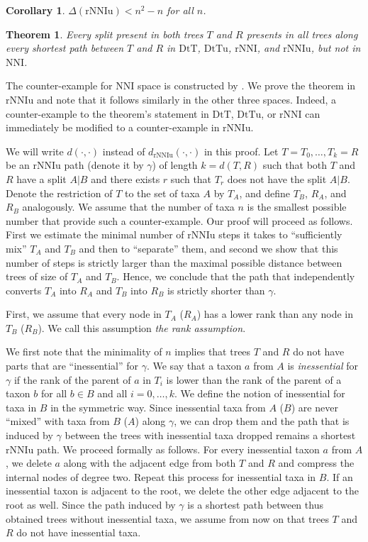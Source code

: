 \documentclass{amsart}
\newtheorem{corollary}[lemma]{Corollary}
\newtheorem{theorem}[lemma]{Theorem}
\theoremstyle{definition}
\newcommand{\nni}{\mathrm{NNI}}
\newcommand{\rnni}{\mathrm{rNNI}}
\newcommand{\rnniu}{\mathrm{rNNIu}}
\newcommand{\mdts}{\mathrm{DtT}}
\newcommand{\mdtsu}{\mathrm{DtTu}}
\begin{document}
\begin{corollary}\label{diameterUpperBoundCoro}
$\Delta(\rnniu) < n^2 - n$ for all $n$.
\end{corollary}

\begin{theorem}\label{splitTheo}
Every split present in both trees $T$ and $R$ presents in all trees along every shortest path between $T$ and $R$ in $\mdts$, $\mdtsu$, $\rnni$, and $\rnniu$, but not in $\nni$.
\end{theorem}

\proof
The counter-example for $\nni$ space is constructed by \textcite{li1996some}.
We prove the theorem in $\rnniu$ and note that it follows similarly in the other three spaces.
Indeed, a counter-example to the theorem's statement in $\mdts$, $\mdtsu$, or $\rnni$ can immediately be modified to a counter-example in $\rnniu$.

We will write $d(\cdot, \cdot)$ instead of $d_\rnniu(\cdot, \cdot)$ in this proof.
Let $T = T_0, \ldots, T_k = R$ be an $\rnniu$ path (denote it by $\gamma$) of length $k = d(T, R)$ such that both $T$ and $R$ have a split $A|B$ and there exists $r$ such that $T_r$ does not have the split $A|B$.
Denote the restriction of $T$ to the set of taxa $A$ by $T_A$, and define $T_B$, $R_A$, and $R_B$ analogously.
We assume that the number of taxa $n$ is the smallest possible number that provide such a counter-example.
Our proof will proceed as follows.
First we estimate the minimal number of $\rnniu$ steps it takes to ``sufficiently mix'' $T_A$ and $T_B$ and then to ``separate'' them, and second we show that this number of steps is strictly larger than the maximal possible distance between trees of size of $T_A$ and $T_B$.
Hence, we conclude that the path that independently converts $T_A$ into $R_A$ and $T_B$ into $R_B$ is strictly shorter than $\gamma$.

First, we assume that every node in $T_A$ ($R_A$) has a lower rank than any node in $T_B$ ($R_B$).
We call this assumption {\em the rank assumption}.

We first note that the minimality of $n$ implies that trees $T$ and $R$ do not have parts that are ``inessential'' for $\gamma$.
We say that a taxon $a$ from $A$ is {\em inessential} for $\gamma$ if the rank of the parent of $a$ in $T_i$ is lower than the rank of the parent of a taxon $b$ for all $b \in B$ and all $i = 0,\ldots,k$.
We define the notion of inessential for taxa in $B$ in the symmetric way.
Since inessential taxa from $A$ ($B$) are never ``mixed'' with taxa from $B$ ($A$) along $\gamma$, we can drop them and the path that is induced by $\gamma$ between the trees with inessential taxa dropped remains a shortest $\rnniu$ path.
We proceed formally as follows.
For every inessential taxon $a$ from $A$, we delete $a$ along with the adjacent edge from both $T$ and $R$ and compress the internal nodes of degree two.
Repeat this process for inessential taxa in $B$.
If an inessential taxon is adjacent to the root, we delete the other edge adjacent to the root as well.
Since the path induced by $\gamma$ is a shortest path between thus obtained trees without inessential taxa, we assume from now on that trees $T$ and $R$ do not have inessential taxa.
\end{document}
